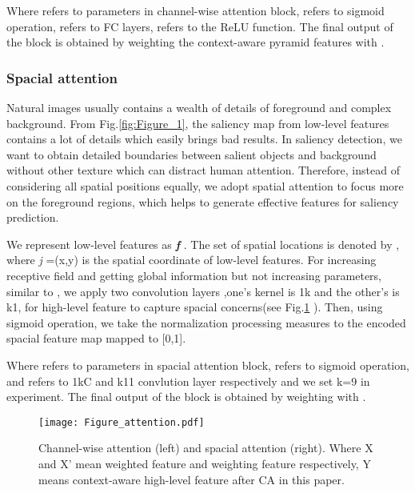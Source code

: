 \documentclass[10pt,twocolumn,letterpaper]{article}
\begin{document}
Where  refers to parameters in channel-wise attention block,  refers to sigmoid operation,  refers to FC layers,  refers to the ReLU function. The final output  of the block is obtained by weighting the context-aware pyramid features with .



\subsubsection{Spacial attention}

Natural images usually contains a wealth of details of foreground and complex background. From Fig.\ref{fig:Figure_1}, the saliency map from low-level features contains a lot of details which easily brings bad results. In saliency detection, we want to obtain detailed boundaries between salient objects and background without other texture which can distract human attention. Therefore, instead of considering all spatial positions equally, we adopt spatial attention to focus more on the foreground regions, which helps to generate effective features for saliency prediction.

We represent low-level features as \textbf{\emph{f}}  . The set of spatial locations is denoted by , where \emph{j} =(x,y) is the spatial coordinate of low-level features. For increasing receptive field and getting global information but not increasing parameters, similar to \cite{gcn}, we apply two convolution layers ,one's kernel is 1k and the other's is k1, for high-level feature to capture spacial concerns(see Fig.\ref {fig:Figure_attention} ). Then, using sigmoid operation, we take the normalization processing measures to the encoded spacial feature map mapped to [0,1].







Where  refers to parameters in spacial attention block,  refers to sigmoid operation,  and  refers to 1kC and k11 convlution layer respectively and we set k=9 in experiment. The final output  of the block is obtained by weighting  with .


\begin{figure}[t]
\centering
\texttt{[image: Figure\_attention.pdf]}
\caption{ Channel-wise attention (left) and spacial attention (right). Where X and X' mean weighted feature and weighting feature respectively, Y means context-aware high-level feature after CA in this paper.}
\label{fig:Figure_attention}
\end{figure}
\end{document}
